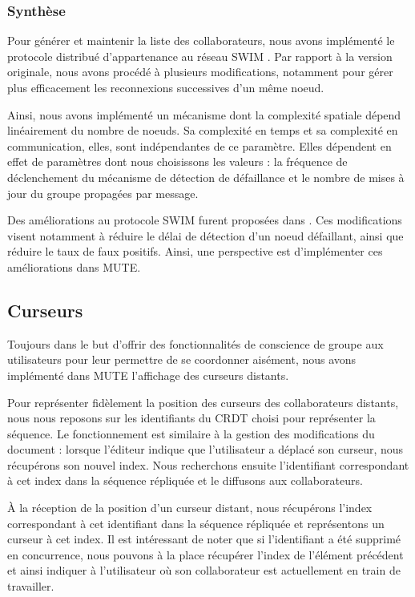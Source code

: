 \subsubsection{Synthèse}

Pour générer et maintenir la liste des collaborateurs, nous avons implémenté le protocole distribué d'appartenance au réseau SWIM \cite{swim2002}.
Par rapport à la version originale, nous avons procédé à plusieurs modifications, notamment pour gérer plus efficacement les reconnexions successives d'un même noeud.

Ainsi, nous avons implémenté un mécanisme dont la complexité spatiale dépend linéairement du nombre de noeuds.
Sa complexité en temps et sa complexité en communication, elles, sont indépendantes de ce paramètre.
Elles dépendent en effet de paramètres dont nous choisissons les valeurs : la fréquence de déclenchement du mécanisme de détection de défaillance et le nombre de mises à jour du groupe propagées par message.

Des améliorations au protocole SWIM furent proposées dans \cite{lifeguard2018}.
Ces modifications visent notamment à réduire le délai de détection d'un noeud défaillant, ainsi que réduire le taux de faux positifs.
Ainsi, une perspective est d'implémenter ces améliorations dans MUTE.

\subsection{Curseurs}

Toujours dans le but d'offrir des fonctionnalités de conscience de groupe aux utilisateurs pour leur permettre de se coordonner aisément, nous avons implémenté dans MUTE l'affichage des curseurs distants.

Pour représenter fidèlement la position des curseurs des collaborateurs distants, nous nous reposons sur les identifiants du \ac{CRDT} choisi pour représenter la séquence.
Le fonctionnement est similaire à la gestion des modifications du document : lorsque l'éditeur indique que l'utilisateur a déplacé son curseur, nous récupérons son nouvel index.
Nous recherchons ensuite l'identifiant correspondant à cet index dans la séquence répliquée et le diffusons aux collaborateurs.

À la réception de la position d'un curseur distant, nous récupérons l'index correspondant à cet identifiant dans la séquence répliquée et représentons un curseur à cet index.
Il est intéressant de noter que si l'identifiant a été supprimé en concurrence, nous pouvons à la place récupérer l'index de l'élément précédent et ainsi indiquer à l'utilisateur où son collaborateur est actuellement en train de travailler.

